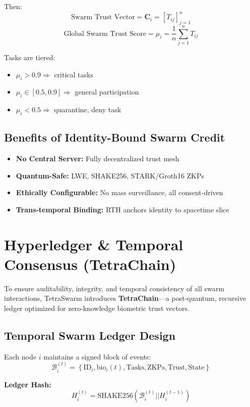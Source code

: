 \documentclass{article}
\begin{document}
Then:
\[
\text{Swarm Trust Vector} = \mathbf{C}_i = [T_{ij}]_{j=1}^n
\]
\[
\text{Global Swarm Trust Score} = \mu_i = \frac{1}{n} \sum_{j=1}^n T_{ij}
\]

Tasks are tiered:
\begin{itemize}
    \item \( \mu_i > 0.9 \Rightarrow \) critical tasks
    \item \( \mu_i \in [0.5, 0.9] \Rightarrow \) general participation
    \item \( \mu_i < 0.5 \Rightarrow \) quarantine, deny task
\end{itemize}

\subsection*{Benefits of Identity-Bound Swarm Credit}

\begin{itemize}
    \item \textbf{No Central Server:} Fully decentralized trust mesh
    \item \textbf{Quantum-Safe:} LWE, SHAKE256, STARK/Groth16 ZKPs
    \item \textbf{Ethically Configurable:} No mass surveillance, all consent-driven
    \item \textbf{Trans-temporal Binding:} RTH anchors identity to spacetime slice
\end{itemize}
\section*{Hyperledger \& Temporal Consensus (TetraChain)}

To ensure auditability, integrity, and temporal consistency of all swarm interactions, TetraSwarm introduces \textbf{TetraChain}—a post-quantum, recursive ledger optimized for zero-knowledge biometric trust vectors.

\subsection*{Temporal Swarm Ledger Design}

Each node \( i \) maintains a signed block of events:
\[
\mathcal{B}_i^{(t)} = \left\{ \text{ID}_i, \text{bio}_i(t), \text{Tasks}, \text{ZKPs}, \text{Trust}, \text{State} \right\}
\]

\textbf{Ledger Hash:}
\[
H^{(t)}_i = \text{SHAKE256}(\mathcal{B}_i^{(t)} || H^{(t-1)}_i)
\]
\end{document}
